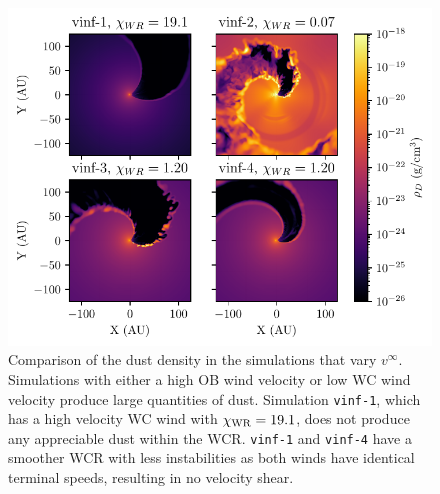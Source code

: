 \begin{figure}
  \centering
  \includegraphics{assets/results/vinf/vinf-finished-rhod.pdf}
  \caption[Dust density comparison of terminal velocity varying systems]{Comparison of the dust density in the simulations that vary $v^\infty$. Simulations with either a high OB wind velocity or low WC wind velocity produce large quantities of dust. Simulation \texttt{vinf-1}, which has a high velocity WC wind with $\chi_\text{WR} = 19.1$, does not produce any appreciable dust within the WCR. \texttt{vinf-1} and \texttt{vinf-4} have a smoother WCR with less instabilities as both winds have identical terminal speeds, resulting in no velocity shear.}
  \label{fig:vinfrhodcomp}
\end{figure}


